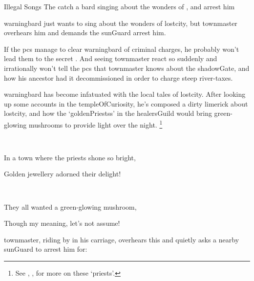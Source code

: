 \banditking

{Illegal Songs}%
{The  catch a bard singing about the wonders of , and arrest him}%

\Gls{warningbard} just wants to sing about the wonders of \gls{lostcity}, but \gls{townmaster} overhears him and demands the \gls{sunGuard} arrest him.

If the \glspl{pc} manage to clear \gls{warningbard} of criminal charges, he probably won't lead them to the secret .
And seeing \gls{townmaster} react so suddenly and irrationally won't tell the \glspl{pc} that \gls{townmaster} knows about the \gls{shadowGate}, and how his ancestor had it decommissioned in order to charge steep river-taxes.

\begin{exampletext}
  \Gls{warningbard} has become infatuated with the local tales of \gls{lostcity}.
  After looking up some accounts in the \gls{templeOfCuriosity}, he's composed a dirty limerick about \gls{lostcity}, and how the `\glspl{goldenPriests}' in the \gls{healersGuild} would bring green-glowing mushrooms to provide light over the night.%
  \footnote{See , , for more on these `priests'.}
\end{exampletext}

\begin{speechtext}
  \textcolor{\pageSideColor}{\eighthnote~\raisebox{6pt}{\quarternote}}

  In a town where the priests shone so bright,
  \textcolor{\pageSideColor}{\eighthnote~\raisebox{3pt}{\twonotes}}

  Golden jewellery adorned their delight!
  \textcolor{\pageSideColor}{\quarternote\raisebox{-4pt}{\eighthnote~}\eighthnote}

  \textcolor{\pageSideColor}{\twonotes~\raisebox{-12pt}{\twonotes}}

  They all wanted a green-glowing mushroom,
  \textcolor{\pageSideColor}{\eighthnote~\raisebox{2pt}{\quarternote}}

  Though my meaning, let's not assume!
  \textcolor{\pageSideColor}{\eighthnote~\raisebox{-7pt}{\quarternote}}

  \textcolor{\pageSideColor}{\quarternote\raisebox{5pt}{\eighthnote~}\eighthnote}
\end{speechtext}

\Gls{townmaster}, riding by in his carriage, overhears this and quietly asks a nearby \gls{sunGuard} to arrest him for:

